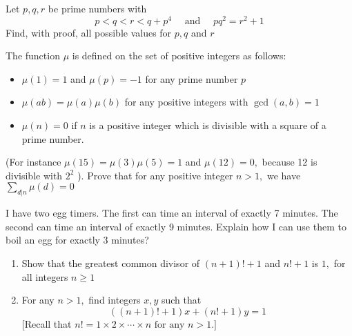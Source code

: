 \documentclass{pset}
\begin{document}
\begin{problems}
\begin{problem}
\begin{enumerate}
    \end{enumerate}
    \end{problem}



    \begin{problem}
    Let \(p, q, r\) be prime numbers with
    $$
        p<q<r<q+p^{4} \quad \text { and } \quad p q^{2}=r^{2}+1
    $$
    Find, with proof, all possible values for \(p, q\) and \(r\)
    \end{problem}

    \begin{problem}
    The function \(\mu\) is defined on the set of positive integers as follows:
    \begin{itemize}
        \item \(\mu(1)=1\) and \(\mu(p)=-1\) for any prime number \(p\)
        \item \(\mu(a b)=\mu(a) \mu(b)\) for any positive integers with \(\operatorname{gcd}(a, b)=1\)
        \item \(\mu(n)=0\) if \(n\) is a positive integer which is divisible with a square of a prime number.
    \end{itemize}
    (For instance \(\mu(15)=\mu(3) \mu(5)=1\) and \(\mu(12)=0,\) because 12 is divisible with \(2^{2}\) ).
    Prove that for any positive integer \(n>1,\) we have \(\sum_{d | n} \mu(d)=0\)
    \end{problem}

    \begin{problem}
    I have two egg timers. The first can time an interval of exactly 7 minutes. The second can time an interval of exactly 9 minutes. Explain how I can use them to boil an egg for exactly 3 minutes?
    \end{problem}

    \begin{problem}
    \begin{enumerate}
        \item Show that the greatest common divisor of \((n+1) !+1\) and \(n !+1\) is \(1,\) for all integers \(n \geq 1\)
        \item For any \(n>1,\) find integers \(x, y\) such that
              $$
                  ((n+1) !+1) x+(n !+1) y=1
              $$
              [Recall that \(n !=1 \times 2 \times \cdots \times n \text { for any } n>1 .]\)
    \end{enumerate}
    \end{problem}


\end{problems}
\end{document}
